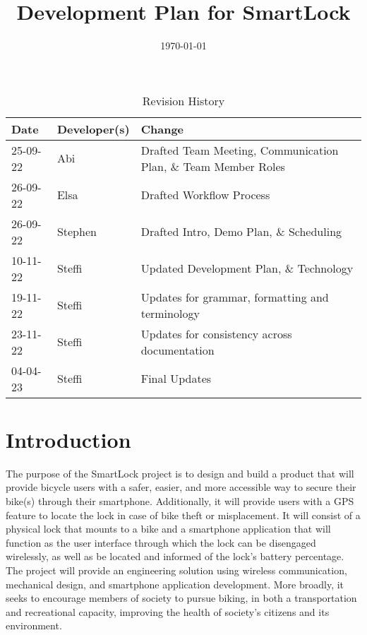 \documentclass{article}
\title{Development Plan for SmartLock\\\progname}
\author{\authname}
\date{\today}
\begin{document}
\maketitle
\thispagestyle{empty}

\newpage
{}
\begin{table}[hp]
\caption{Revision History} \label{TblRevisionHistory}
\begin{tabularx}{\textwidth}{llX}
\toprule
\textbf{Date} & \textbf{Developer(s)} & \textbf{Change}\\
\midrule
25-09-22 & Abi & Drafted Team Meeting, Communication Plan, \& Team Member Roles\\
26-09-22 & Elsa & Drafted Workflow Process\\
26-09-22 & Stephen & Drafted Intro, Demo Plan, \& Scheduling\\
10-11-22 & Steffi & Updated Development Plan, \& Technology\\
19-11-22 & Steffi & Updates for grammar, formatting and terminology\\
23-11-22 & Steffi & Updates for consistency across documentation\\
04-04-23 & Steffi & Final Updates\\
\bottomrule

\end{tabularx}
\end{table}

\newpage
\tableofcontents
\listoftables

\newpage
{}
\section{Introduction}

The purpose of the SmartLock project is to design and build a product that will provide bicycle users with a safer, easier, and more accessible way to secure their bike(s) through their smartphone. Additionally, it will provide users with a GPS feature to locate the lock in case of bike theft or misplacement.  It will consist of a physical lock that mounts to a bike and a smartphone application that will function as the user interface through which the lock can be disengaged wirelessly, as well as be located and informed of the lock's battery percentage. The project will provide an engineering solution using wireless communication, mechanical design, and smartphone application development. More broadly, it seeks to encourage members of society to pursue biking, in both a transportation and recreational capacity, improving the health of society’s citizens and its environment.  
\end{document}

